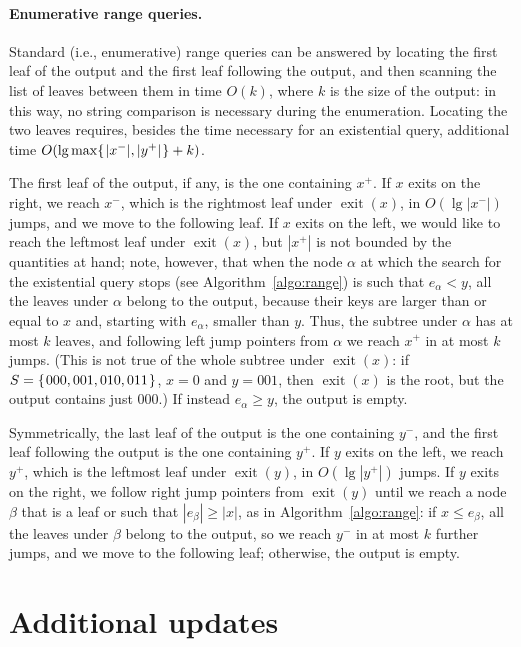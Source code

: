 \documentclass[a4paper]{article}
\newcommand{\exit}[1]{\operatorname{exit}(#1)}
\newcommand{\?}{\mskip1.5mu}
\begin{document}
\paragraph{Enumerative range queries.} Standard (i.e., enumerative) range queries can be answered by
locating the first leaf of the output and the first leaf following the output, 
and then scanning the list of leaves between them in time $O(k)$, where $k$ is the size of the output:
in this way, no string comparison is necessary during the enumeration. Locating the two leaves requires, besides the time 
necessary for an existential query,
additional time $O(\lg\max\{\?|x^-|,|y^+|\?\}+k)$.

The first leaf of the output, if any, is the one containing $x^+$. If $x$ exits on the right, 
we reach $x^-$, which is the rightmost leaf under $\exit x$, in $O(\lg|x^-|)$ jumps, and we move to the following leaf. 
If $x$ exits on the left, we would like to reach the leftmost leaf under $\exit x$, but $|x^+|$ is not 
bounded by the quantities at hand; note, however, that when the node $\alpha$ at which the search for the existential
query stops (see Algorithm~\ref{algo:range}) is such that $e_\alpha<y$, all the leaves under $\alpha$ belong to the output, 
because their keys are larger than or equal to $x$ and, starting with $e_\alpha$, smaller than $y$.
Thus, the subtree under $\alpha$ has at most $k$ leaves, and following left jump pointers from $\alpha$ we reach $x^+$
in at most $k$ jumps. (This is not true of the whole subtree under $\exit x$: 
if $S=\{\?000, 001, 010, 011\?\}$, $x=0$ and $y=001$, then $\exit x$ is the root, but the output contains
just $000$.) If instead $e_\alpha\geq y$, the output is empty.

Symmetrically, the last leaf of the output is the one containing $y^-$, and the first leaf following the output 
is the one containing $y^+$. If $y$ exits on the left, we reach $y^+$,
which is the leftmost leaf under $\exit y$, in $O(\lg|y^+|)$ jumps. If $y$ exits on the right, 
we follow right jump pointers from $\exit y$ until we reach a node $\beta$ that is a leaf or such that $|e_\beta|\geq|x|$,
as in Algorithm~\ref{algo:range}: if $x\leq e_\beta$, all the leaves under $\beta$ belong to the output, so we reach $y^-$ 
in at most $k$ further jumps, and we move to the following leaf; otherwise, the output is empty.


\section{Additional updates}
\label{sec:addupdates}
\end{document}
